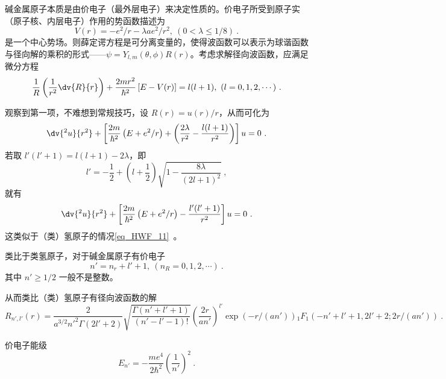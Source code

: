 

碱金属原子本质是由价电子（最外层电子）来决定性质的。价电子所受到原子实（原子核、内层电子）作用的势函数描述为
\begin{equation}
V(r) = -e^2/r - \lambda a e^2/r^2, \ (0 < \lambda \le 1/8) ~.
\end{equation}
是一个中心势场。则薛定谔方程是可分离变量的，使得波函数可以表示为球谐函数与径向解的乘积的形式——$\psi = Y_{l, m}(\theta, \phi) R(r)$。考虑求解径向波函数，应满足微分方程
\begin{equation}\label{eq_AlkmQM_1}
\frac{1}{R} \left(\frac{1}{r^2} \dv{R}{r}\right) + \frac{2mr^2}{\hbar^2} \left[E - V(r)\right] = l(l+1), \ (l = 0, 1, 2, \cdots)~.
\end{equation}

观察到第一项，不难想到常规技巧，设 $R(r) = u(r) /r$，从而可化为
\begin{equation}
\dv{^2 u}{r^2} + \left[\frac{2m}{\hbar^2}\left(E + e^2/r\right) + \left(\frac{2 \lambda}{r^2} - \frac{l(l+1)}{r^2}\right)\right]u = 0 ~.
\end{equation}
若取 $l'(l'+1) = l(l+1) - 2\lambda$，即
$$l' = -\frac12 + \left(l + \frac12\right) \sqrt{1 - \frac{8\lambda}{(2l+1)^2}} ~,$$
就有
\begin{equation}
\dv{^2 u}{r^2} + \left[\frac{2m}{\hbar^2}\left(E + e^2/r\right) - \frac{l'(l'+1)}{r^2}\right]u = 0 ~.
\end{equation}
这类似于（类）氢原子的情况\autoref{eq_HWF_11}~。

类比于类氢原子，对于碱金属原子有价电子
$$n' = n_r + l' + 1, \ (n_R = 0, 1, 2, \cdots) ~.$$
其中 $n' \ge 1/2$ 一般不是整数。

从而类比（类）氢原子有径向波函数的解
\begin{equation}
R_{n', l'}(r) = \frac{2}{a^{3/2} n'^2 \Gamma(2l'+2)}\sqrt{\frac{\Gamma(n'+l'+1)}{(n'-l'-1)!}} \left(\frac{2r}{an'}\right)^{l'} \exp(-r/(an')) {_1F_1}(-n'+l'+1, 2l'+2; 2r/(an'))~.
\end{equation}

价电子能级
\begin{equation}
E_{n'} = -\frac{me^4}{2\hbar^2} \left(\frac{1}{n'}\right)^2 ~.
\end{equation}

